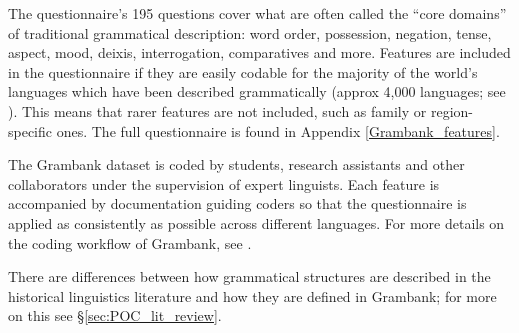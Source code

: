 \documentclass[12pt,letterpaper]{article}
\begin{document}


The questionnaire's 195 questions cover what are often called the ``core domains'' of traditional grammatical description: word order, possession, negation, tense, aspect, mood, deixis, interrogation, comparatives and more. Features are included in the questionnaire if they are easily codable for the majority of the world's languages which have been described grammatically (approx 4,000 languages; see \citealt{hammarstrom2018simultaneous}). This means that rarer features are not included, such as family or region-specific ones. The full questionnaire is found in Appendix \ref{Grambank_features}.

The Grambank dataset is coded by students, research assistants and other collaborators under the supervision of expert linguists. Each feature is accompanied by documentation guiding coders so that the questionnaire is applied as consistently as possible across different languages. For more details on the coding workflow of Grambank, see \citet{slingerland2020coding}. %

There are differences between how grammatical structures are described in the historical linguistics literature and how they are defined in Grambank; for more on this see §\ref{sec:POC_lit_review}.

\end{document}
